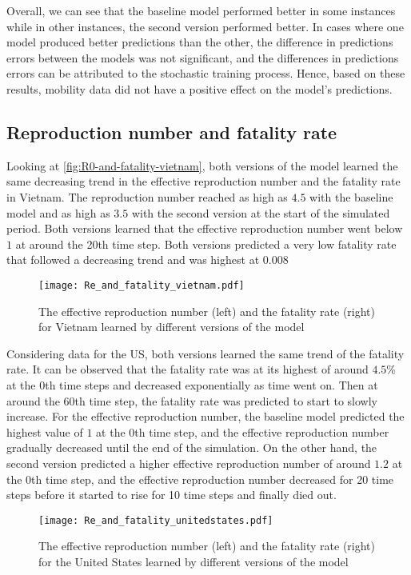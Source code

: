 Overall, we can see that the baseline model performed better in some instances while in other instances, the second version performed better.
In cases where one model produced better predictions than the other, the difference in predictions errors between the models was not significant, and the differences in predictions errors can be attributed to the stochastic training process.
Hence, based on these results, mobility data did not have a positive effect on the model's predictions.

\subsection{Reproduction number and fatality rate}

Looking at \autoref{fig:R0-and-fatality-vietnam}, both versions of the model learned the same decreasing trend in the effective reproduction number and the fatality rate in Vietnam.
The reproduction number reached as high as $4.5$ with the baseline model and as high as $3.5$ with the second version at the start of the simulated period.
Both versions learned that the effective reproduction number went below $1$ at around the 20th time step.
Both versions predicted a very low fatality rate that followed a decreasing trend and was highest at $0.008$

\begin{figure}[!htb]
    \centering
    \texttt{[image: Re\_and\_fatality\_vietnam.pdf]}
    \caption{The effective reproduction number (left) and the fatality rate (right) for Vietnam learned by different versions of the model}
    \label{fig:R0-and-fatality-vietnam}
\end{figure}

Considering data for the \gls{US}, both versions learned the same trend of the fatality rate.
It can be observed that the fatality rate was at its highest of around $4.5$\% at the 0th time steps and decreased exponentially as time went on.
Then at around the 60th time step, the fatality rate was predicted to start to slowly increase.
For the effective reproduction number, the baseline model predicted the highest value of $1$ at the 0th time step, and the effective reproduction number gradually decreased until the end of the simulation.
On the other hand, the second version predicted a higher effective reproduction number of around $1.2$ at the 0th time step, and the effective reproduction number decreased for 20 time steps before it started to rise for 10 time steps and finally died out.

\begin{figure}[!htb]
    \centering
    \texttt{[image: Re\_and\_fatality\_unitedstates.pdf]}
    \caption{The effective reproduction number (left) and the fatality rate (right) for the United States learned by different versions of the model}
    \label{fig:R0-and-fatality-usa}
\end{figure}
